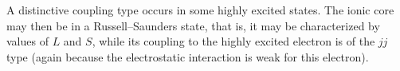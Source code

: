A distinctive coupling type occurs in some highly excited states. The ionic core may then be in a Russell--Saunders state, that is, it may be characterized by values of $L$ and $S$, while its coupling to the highly excited electron is of the $jj$ type (again because the electrostatic interaction is weak for this electron).
